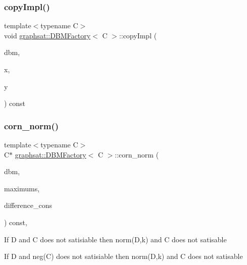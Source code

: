 \subsubsection{\texorpdfstring{copyImpl()}{copyImpl()}}
{\footnotesize\ttfamily template$<$typename C$>$ \\
void \mbox{\hyperlink{classgraphsat_1_1_d_b_m_factory}{graphsat\+::\+D\+B\+M\+Factory}}$<$ C $>$\+::copy\+Impl (\begin{DoxyParamCaption}\item[{C $\ast$}]{dbm,  }\item[{const int}]{x,  }\item[{const int}]{y }\end{DoxyParamCaption}) const\hspace{0.3cm}{\ttfamily [inline]}}

\mbox{\label{classgraphsat_1_1_d_b_m_factory_a24fb30c6cf4305ed996f4ca29a5adb65}} 
\subsubsection{\texorpdfstring{corn\_norm()}{corn\_norm()}}
{\footnotesize\ttfamily template$<$typename C$>$ \\
C$\ast$ \mbox{\hyperlink{classgraphsat_1_1_d_b_m_factory}{graphsat\+::\+D\+B\+M\+Factory}}$<$ C $>$\+::corn\+\_\+norm (\begin{DoxyParamCaption}\item[{C $\ast$}]{dbm,  }\item[{const vector$<$ C $>$ \&}]{maximums,  }\item[{const vector$<$ \mbox{\hyperlink{classgraphsat_1_1_clock_constraint}{Clock\+Constraint}}$<$ C $>$$>$ \&}]{difference\+\_\+cons }\end{DoxyParamCaption}) const\hspace{0.3cm}{\ttfamily [inline]}, {\ttfamily [private]}}

If D and C does not satisiable then norm(\+D,k) and C does not satisable

If D and neg(\+C) does not satisiable then norm(\+D,k) and C does not satisable\mbox{\label{classgraphsat_1_1_d_b_m_factory_ac51eaa5ba3e4049b0de4ac8fe5950ca1}} 

